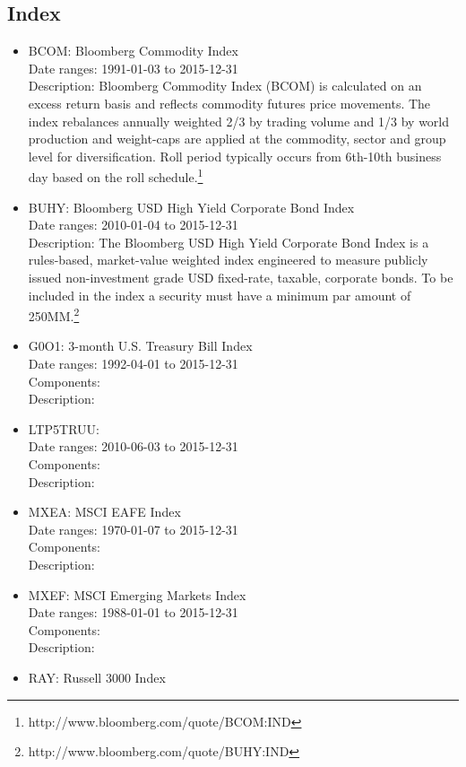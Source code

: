 \documentclass[12pt]{article}
\begin{document}
\subsection{Index}

\begin{itemize}
\item BCOM: Bloomberg Commodity Index\\
Date ranges: 1991-01-03 to 2015-12-31\\
Description: Bloomberg Commodity Index (BCOM) is calculated on an excess return basis and reflects commodity futures price movements. The index rebalances annually weighted 2/3 by trading volume and 1/3 by world production and weight-caps are applied at the commodity, sector and group level for diversification. Roll period typically occurs from 6th-10th business day based on the roll schedule.\footnote{http://www.bloomberg.com/quote/BCOM:IND}
\item BUHY: Bloomberg USD High Yield Corporate Bond Index\\
Date ranges: 2010-01-04 to 2015-12-31 \\
Description: The Bloomberg USD High Yield Corporate Bond Index is a rules-based, market-value weighted index engineered to measure publicly issued non-investment grade USD fixed-rate, taxable, corporate bonds. To be included in the index a security must have a minimum par amount of 250MM.\footnote{http://www.bloomberg.com/quote/BUHY:IND}
\item G0O1: 3-month U.S. Treasury Bill Index\\
Date ranges: 1992-04-01 to 2015-12-31 \\
Components: \\
Description:
\item LTP5TRUU: \\
Date ranges: 2010-06-03 to 2015-12-31 \\
Components: \\
Description:
\item MXEA: MSCI EAFE Index \\
Date ranges: 1970-01-07 to 2015-12-31 \\
Components: \\
Description:
\item MXEF: MSCI Emerging Markets Index\\
Date ranges: 1988-01-01 to 2015-12-31 \\
Components: \\
Description:
\item RAY: Russell 3000 Index\\

\end{itemize}
\end{document}
